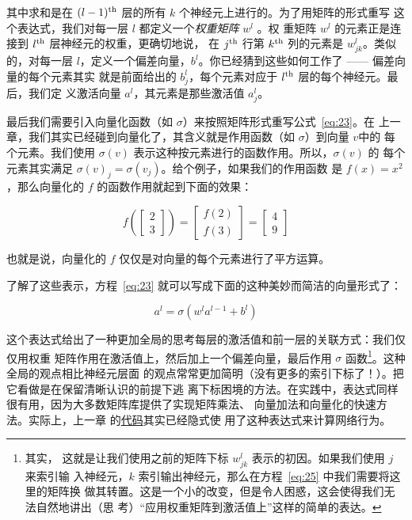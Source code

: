其中求和是在 $(l-1)^{\rm th}$ 层的所有 $k$ 个神经元上进行的。为了用矩阵的形式重写
这个表达式，我们对每一层 $l$ 都定义一个\emph{权重矩阵} $w^l$ 。权
重矩阵 $w^l$ 的元素正是连接到 $l^{\rm th}$ 层神经元的权重，更确切地说，
在 $j^{\rm th}$ 行第 $k^{\rm th}$ 列的元素是 $w^l_{jk}$。类似的，对每一层
$l$，定义一个偏差向量，$b^l$。你已经猜到这些如何工作了 —— 偏差向量的每个元素其实
就是前面给出的 $b^l_j$，每个元素对应于 $l^{\rm th}$ 层的每个神经元。最后，我们定
义激活向量 $a^l$，其元素是那些激活值 $a^l_j$。

最后我们需要引入向量化函数（如 $\sigma$）来按照矩阵形式重写公式~\eqref{eq:23}。在
上一章，我们其实已经碰到向量化了，其含义就是作用函数（如 $\sigma$）到向量 $v$中的
每个元素。我们使用 $\sigma(v)$ 表示这种按元素进行的函数作用。所以，$\sigma(v)$ 的
每个元素其实满足 $\sigma(v)_j = \sigma(v_j)$。给个例子，如果我们的作用函数
是 $f(x) = x^2$，那么向量化的 $f$ 的函数作用就起到下面的效果：

\begin{equation}
  f\left(\left[ \begin{array}{c} 2 \\ 3 \end{array} \right] \right)
  = \left[ \begin{array}{c} f(2) \\ f(3) \end{array} \right]
  = \left[ \begin{array}{c} 4 \\ 9 \end{array} \right]
\label{eq:24}\tag{24}
\end{equation}

也就是说，向量化的 $f$ 仅仅是对向量的每个元素进行了平方运算。

了解了这些表示，方程~\eqref{eq:23} 就可以写成下面的这种美妙而简洁的向量形式了：

\begin{equation}
  a^{l} = \sigma(w^l a^{l-1}+b^l)
  \label{eq:25}\tag{25}
\end{equation}

这个表达式给出了一种更加全局的思考每层的激活值和前一层的关联方式：我们仅仅用权重
矩阵作用在激活值上，然后加上一个偏差向量，最后作用 $\sigma$ 函数\footnote{其实，
  这就是让我们使用之前的矩阵下标 $w_{jk}^l$ 表示的初因。如果我们使用 $j$ 来索引输
  入神经元，$k$ 索引输出神经元，那么在方程~\eqref{eq:25} 中我们需要将这里的矩阵换
  做其转置。这是一个小的改变，但是令人困惑，这会使得我们无法自然地讲出（思
  考）``应用权重矩阵到激活值上''这样的简单的表达。}。这种全局的观点相比神经元层面
的观点常常更加简明（没有更多的索引下标了！）。把它看做是在保留清晰认识的前提下逃
离下标困境的方法。在实践中，表达式同样很有用，因为大多数矩阵库提供了实现矩阵乘法、
向量加法和向量化的快速方法。实际上，上一章
的\hyperref[sec:implementing_our_network_to_classify_digits]{代码}其实已经隐式使
用了这种表达式来计算网络行为。

